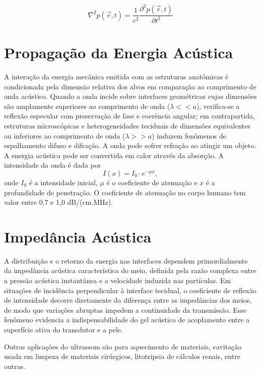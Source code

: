 \documentclass[a4paper,12pt,oneside,openright]{abntex2}
\begin{document}
\begin{equation}
  \label{eq:wave_equation}
  \nabla^2 p(\vec{r}, t) = \frac{1}{c^2} \frac{\partial^2 p(\vec{r}, t)}{\partial t^2}
\end{equation}

\section{Propagação da Energia Acústica}

A interação da energia mecânica emitida com as estruturas anatômicas é condicionada pela dimensão relativa dos alvos em comparação ao comprimento de onda acústico. Quando a onda incide sobre interfaces geométricas cujas dimensões são amplamente superiores ao comprimento de onda ($\lambda << a$), verifica-se a reflexão especular com preservação de fase e coerência angular; em contrapartida, estruturas microscópicas e heterogeneidades teciduais de dimensões equivalentes ou inferiores ao comprimento de onda ($\lambda >> a$) induzem fenômenos de espalhamento difuso e difração. A onda pode sofrer refração ao atingir um objeto. A energia acústica pode ser convertida em calor através da absorção. A intensidade da onda é dada por
\begin{equation}
  I(x) = I_0 \cdot e^{-\mu x},
\end{equation}
onde $I_0$ é a intensidade inicial, $\mu$ é o coeficiente de atenuação e $x$ é a profundidade de penetração. O coeficiente de atenuação no corpo humano tem valor entre 0,7 e 1,0 dB/(cm.MHz).

\section{Impedância Acústica}

A distribuição e o retorno da energia nas interfaces dependem primordialmente da impedância acústica característica do meio, definida pela razão complexa entre a pressão acústica instantânea e a velocidade induzida nas partículas. Em situações de incidência perpendicular à interface tecidual, o coeficiente de reflexão de intensidade decorre diretamente da diferença entre as impedâncias dos meios, de modo que variações abruptas impedem a continuidade da transmissão. Esse fenômeno evidencia a indispensabilidade do gel acústico de acoplamento entre a superfície ativa do transdutor e a pele.

Outras aplicações do ultrassom são para aquecimento de materiais, cavitação usada em limpeza de materiais cirúrgicos, litotripsia de cálculos renais, entre outras.
\end{document}
